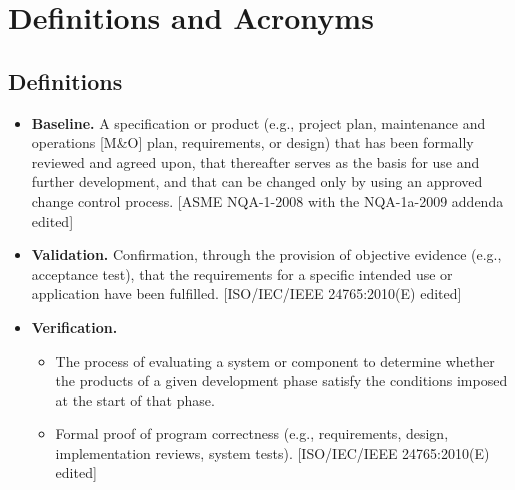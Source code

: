 \section{Definitions and Acronyms}

\subsection{Definitions}
\begin{itemize}
  \item \textbf{Baseline.} A specification or product (e.g., project plan, maintenance and operations [M\&O] plan, requirements, or 
design) that has been formally reviewed and agreed upon, that thereafter serves as the basis for use and further 
development, and that can be changed only by using an approved change control process. [ASME NQA-1-2008 with the 
NQA-1a-2009 addenda edited]
  \item \textbf{Validation.} Confirmation, through the provision of objective evidence (e.g., acceptance test), that the requirements 
for a specific intended use or application have been fulfilled. [ISO/IEC/IEEE 24765:2010(E) edited]
  \item \textbf{Verification.}
  \begin{itemize}
     \item The process of evaluating a system or component to determine whether the products of a given development 
     phase satisfy the conditions imposed at the start of that phase.
     \item  Formal proof of program correctness (e.g., requirements, design, implementation reviews, system tests). 
     [ISO/IEC/IEEE 24765:2010(E) edited]
  \end{itemize}
\end{itemize}

